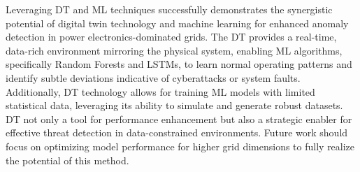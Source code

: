 Leveraging DT and ML techniques successfully demonstrates the synergistic potential of digital twin technology and machine learning for enhanced anomaly detection in power electronics-dominated grids. The DT provides a real-time, data-rich environment mirroring the physical system, enabling ML algorithms, specifically Random Forests and LSTMs, to learn normal operating patterns and identify subtle deviations indicative of cyberattacks or system faults.  Additionally, DT technology allows for training ML models with limited statistical data, leveraging its ability to simulate and generate robust datasets. DT not only a tool for performance enhancement but also a strategic enabler for effective threat detection in data-constrained environments. Future work should focus on optimizing model performance for higher grid dimensions to fully realize the potential of this method.